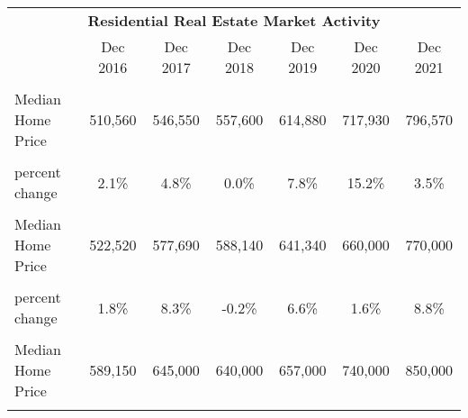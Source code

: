 \begin{table}
\centering
\begin{tabular}{lcccccc}
\toprule
\multicolumn{7}{c}{\textbf{Residential Real Estate Market Activity}} \\
\cmidrule(l{3pt}r{3pt}){1-7}
  & Dec 2016 & Dec 2017 & Dec 2018 & Dec 2019 & Dec 2020 & Dec 2021\\
\midrule
\textbf{\cellcolor{gray!6}{California}} & \textbf{\cellcolor{gray!6}{}} & \textbf{\cellcolor{gray!6}{}} & \textbf{\cellcolor{gray!6}{}} & \textbf{\cellcolor{gray!6}{}} & \textbf{\cellcolor{gray!6}{}} & \textbf{\cellcolor{gray!6}{}}\\
Median Home Price & 510,560 & 546,550 & 557,600 & 614,880 & 717,930 & 796,570\\
\cellcolor{gray!6}{Median Home Price (\$2009)} & \cellcolor{gray!6}{457,344} & \cellcolor{gray!6}{479,373} & \cellcolor{gray!6}{479,464} & \cellcolor{gray!6}{516,760} & \cellcolor{gray!6}{595,493} & \cellcolor{gray!6}{616,376}\\
percent change & 2.1\% & 4.8\% & 0.0\% & 7.8\% & 15.2\% & 3.5\%\\
\textbf{\cellcolor{gray!6}{Los Angeles County}} & \textbf{\cellcolor{gray!6}{}} & \textbf{\cellcolor{gray!6}{}} & \textbf{\cellcolor{gray!6}{}} & \textbf{\cellcolor{gray!6}{}} & \textbf{\cellcolor{gray!6}{}} & \textbf{\cellcolor{gray!6}{}}\\
\addlinespace
Median Home Price & 522,520 & 577,690 & 588,140 & 641,340 & 660,000 & 770,000\\
\cellcolor{gray!6}{Median Home Price (\$2009)} & \cellcolor{gray!6}{468,058} & \cellcolor{gray!6}{506,685} & \cellcolor{gray!6}{505,724} & \cellcolor{gray!6}{538,997} & \cellcolor{gray!6}{547,442} & \cellcolor{gray!6}{595,817}\\
percent change & 1.8\% & 8.3\% & -0.2\% & 6.6\% & 1.6\% & 8.8\%\\
\textbf{\cellcolor{gray!6}{Ventura County}} & \textbf{\cellcolor{gray!6}{}} & \textbf{\cellcolor{gray!6}{}} & \textbf{\cellcolor{gray!6}{}} & \textbf{\cellcolor{gray!6}{}} & \textbf{\cellcolor{gray!6}{}} & \textbf{\cellcolor{gray!6}{}}\\
Median Home Price & 589,150 & 645,000 & 640,000 & 657,000 & 740,000 & 850,000\\
\addlinespace
\cellcolor{gray!6}{Median Home Price (\$2009)} & \cellcolor{gray!6}{527,743} & \cellcolor{gray!6}{565,722} & \cellcolor{gray!6}{550,317} & \cellcolor{gray!6}{552,158} & \cellcolor{gray!6}{613,799} & \cellcolor{gray!6}{657,720}\\

\end{tabular}
\end{table}

